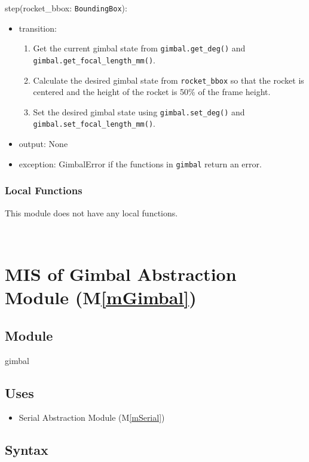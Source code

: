 \documentclass[12pt, titlepage]{article}
\newcommand{\mref}[1]{M\ref{#1}}
\begin{document}
\noindent step(rocket\_bbox: \texttt{BoundingBox}):
\begin{itemize}
  \item transition:
        \begin{enumerate}
          \item Get the current gimbal state from \texttt{gimbal.get\_deg()} and
                \texttt{gimbal.get\_focal\_length\_mm()}.
          \item Calculate the desired gimbal state from \texttt{rocket\_bbox} so that the
                rocket is centered and the height of the rocket is 50\% of the frame height.
          \item Set the desired gimbal state using \texttt{gimbal.set\_deg()} and
                \texttt{gimbal.set\_focal\_length\_mm()}.
        \end{enumerate}
  \item output: None
  \item exception: GimbalError if the functions in \texttt{gimbal} return an error.
\end{itemize}

\subsubsection{Local Functions}

This module does not have any local functions.

\ \

\section{MIS of Gimbal Abstraction Module (\mref{mGimbal})}

\subsection{Module}

gimbal

\subsection{Uses}

\begin{itemize}
  \item Serial Abstraction Module (\mref{mSerial})
\end{itemize}

\subsection{Syntax}
\end{document}

